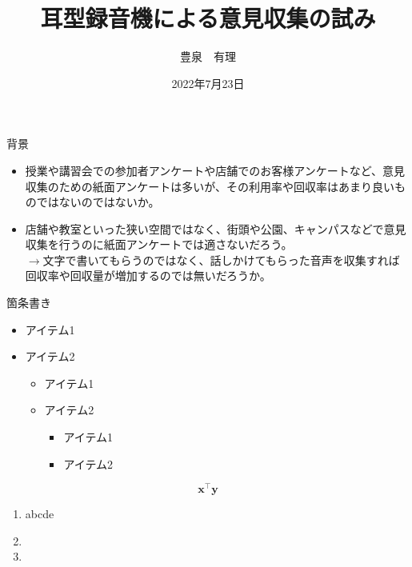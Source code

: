 \documentclass[aspectratio=169, dvipdfmx, 18pt]{beamer} %
\title[Short title]{耳型録音機による意見収集の試み}
\author[]{豊泉　有理}
\date{2022年7月23日}
\begin{document}
\maketitle


\begin{frame}{背景}
\begin{itemize}
	\item 授業や講習会での参加者アンケートや店舗でのお客様アンケートなど、意見収集のための紙面アンケートは多いが、その利用率や回収率はあまり良いものではないのではないか。
	\item 店舗や教室といった狭い空間ではなく、街頭や公園、キャンパスなどで意見収集を行うのに紙面アンケートでは適さないだろう。\\$\to$文字で書いてもらうのではなく、話しかけてもらった音声を収集すれば回収率や回収量が増加するのでは無いだろうか。
\end{itemize}
\end{frame}

\begin{frame}{箇条書き}
    \begin{itemize}
    \item アイテム1
    \item \alert{アイテム2}
        \begin{itemize}
        \item アイテム1
        \item \alert{アイテム2}
            \begin{itemize}
            \item アイテム1
            \item \alert{アイテム2}
            \end{itemize}
        \end{itemize}
    \end{itemize}
    \[
    \bm{x}^\top\bm{y}
    \]
    \begin{enumerate}
    \item abcde
    \item {}
    \item 
    \end{enumerate}
\end{frame}
\end{document}
